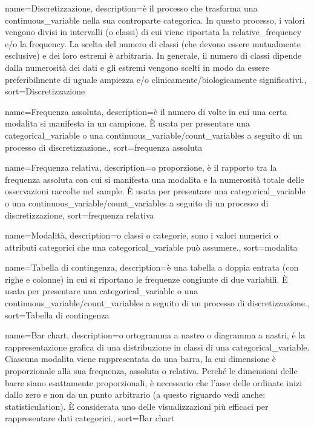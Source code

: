 
{
	 name={Discretizzazione},
	 description={\`e il processo che trasforma una \gls{continuous_variable} nella sua controparte categorica. In questo processo, i valori vengono divisi in intervalli (o classi) di cui viene riportata la \gls{relative_frequency} e/o la \gls{frequency}. La scelta del numero di classi (che devono essere mutualmente esclusive) e dei loro estremi \`e arbitraria. In generale, il numero di classi dipende dalla numerosit\`a dei dati e gli estremi vengono scelti in modo da essere preferibilmente di uguale ampiezza e/o clinicamente/biologicamente significativi.},
	 sort={Discretizzazione}
}

{
	 name={Frequenza assoluta},
	 description={\`e il numero di volte in cui una certa \gls{modalita} si manifesta in un campione. \`E usata per presentare una \gls{categorical_variable} o una \gls{continuous_variable}/\gls{count_variables} a seguito di un processo di \gls{discretizzazione}.},
	 sort={frequenza assoluta }
}

{
	 name={Frequenza relativa},
	 description={o proporzione, \`e il rapporto tra la frequenza assoluta con cui si manifesta una \gls{modalita} e la numerosit\`a totale delle osservazioni raccolte nel \gls{sample}. \`E usata per presentare una \gls{categorical_variable} o una \gls{continuous_variable}/\gls{count_variables} a seguito di un processo di \gls{discretizzazione}},
	 sort={frequenza relativa}
}

{
	 name={Modalit\`a},
	 description={o classi o categorie, sono i valori numerici o attributi categorici che una \gls{categorical_variable} pu\`o assumere.},
	 sort={modalita}
}

{
	 name={Tabella di contingenza},
	 description={\`e una tabella a doppia entrata (con righe e colonne) in cui si riportano le frequenze congiunte di due variabili. \`E usata per presentare una \gls{categorical_variable} o una \gls{continuous_variable}/\gls{count_variables} a seguito di un processo di \gls{discretizzazione}.},
	 sort={Tabella di contingenza}
}

{
	 name={Bar chart},
	 description={o ortogramma a nastro o diagramma a nastri, \`e la rappresentazione grafica di una distribuzione in classi di una \gls{categorical_variable}. Ciascuna \gls{modalita} viene rappresentata da una barra, la cui dimensione \`e proporzionale alla sua frequenza, assoluta o relativa. Perch\'e le dimensioni delle barre siano esattamente proporzionali, \`e necessario che l'asse delle ordinate inizi dallo zero e non da un punto arbitrario (a questo riguardo vedi anche: \gls{statisticulation}). \`E considerata uno delle visualizzazioni pi\`u efficaci per rappresentare dati categorici.},
	 sort={Bar chart}
}


